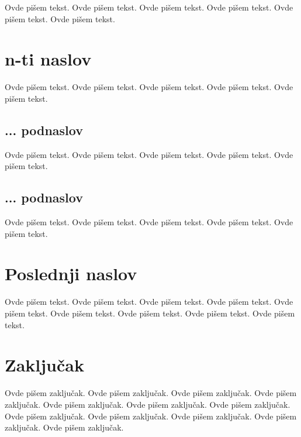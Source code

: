 \documentclass[a4paper]{article}
\begin{document}
{Ovde pišem tekst. 
Ovde pišem tekst. 
Ovde pišem tekst. 
Ovde pišem tekst. 
Ovde pišem tekst. 
Ovde pišem tekst. 

\section{n-ti naslov}
\label{sec:naslovN}

Ovde pišem tekst. 
Ovde pišem tekst. 
Ovde pišem tekst. 
Ovde pišem tekst. 
Ovde pišem tekst. 

\subsection{... podnaslov}
\label{subsec:podnaslovK}

Ovde pišem tekst. 
Ovde pišem tekst. 
Ovde pišem tekst. 
Ovde pišem tekst. 
Ovde pišem tekst. 

\subsection{... podnaslov}
\label{subsec:podnaslovM}

Ovde pišem tekst. 
Ovde pišem tekst. 
Ovde pišem tekst. 
Ovde pišem tekst. 
Ovde pišem tekst. 

\section{Poslednji naslov}
\label{sec:naslovM}

Ovde pišem tekst. 
Ovde pišem tekst. 
Ovde pišem tekst. 
Ovde pišem tekst. 
Ovde pišem tekst. 
Ovde pišem tekst. 
Ovde pišem tekst. 
Ovde pišem tekst. 
Ovde pišem tekst. 

\section{Zaključak}
\label{sec:zakljucak}

Ovde pišem zaključak. 
Ovde pišem zaključak. 
Ovde pišem zaključak. 
Ovde pišem zaključak. 
Ovde pišem zaključak. 
Ovde pišem zaključak. 
Ovde pišem zaključak. 
Ovde pišem zaključak. 
Ovde pišem zaključak. 
Ovde pišem zaključak. 
Ovde pišem zaključak. 
Ovde pišem zaključak. 


\appendix

\begin{thebibliography}{9}


\end{thebibliography}}
\end{document}
